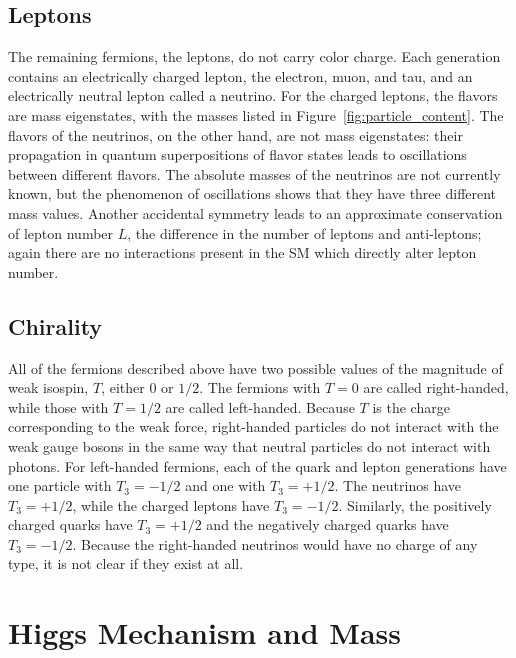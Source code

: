 \subsection{Leptons}

The remaining fermions, the leptons, do not carry color charge.
Each generation contains an electrically charged lepton, the electron, muon, and tau, and an electrically neutral lepton called a neutrino.
For the charged leptons, the flavors are mass eigenstates, with the masses listed in Figure~\ref{fig:particle_content}.
The flavors of the neutrinos, on the other hand, are not mass eigenstates: their propagation in quantum superpositions of flavor states leads to oscillations between different flavors.
The absolute masses of the neutrinos are not currently known, but the phenomenon of oscillations shows that they have three different mass values.
Another accidental symmetry leads to an approximate conservation of lepton number $L$, the difference in the number of leptons and anti-leptons; again there are no interactions present in the \ac{SM} which directly alter lepton number.

\subsection{Chirality}

All of the fermions described above have two possible values of the magnitude of weak isospin, $T$, either $0$ or $1/2$.
The fermions with $T = 0$ are called right-handed, while those with $T=1/2$ are called left-handed.
Because $T$ is the charge corresponding to the weak force, right-handed particles do not interact with the weak gauge bosons in the same way that neutral particles do not interact with photons.
For left-handed fermions, each of the quark and lepton generations have one particle with $T_3 = -1/2$ and one with $T_3 = +1/2$.
The neutrinos have $T_3 = +1/2$, while the charged leptons have $T_3 = -1/2$.
Similarly, the positively charged quarks have $T_3 = +1/2$ and the negatively charged quarks have $T_3 = -1/2$.
Because the right-handed neutrinos would have no charge of any type, it is not clear if they exist at all.


\section{Higgs Mechanism and Mass}
\label{sec:higgs_mechanism}

